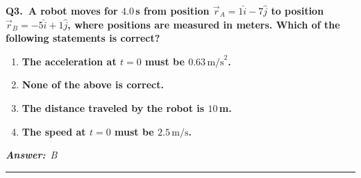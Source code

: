 \documentclass[11pt]{article}
\newcommand{\QuestionStyle}[1]{{\large\bfseries\boldmath #1}}
\newcommand{\AnswerStyle}[1]{{\large\bfseries\boldmath #1}}
\newcommand{\ReasonStyle}[1]{{\normalsize #1}}
\newif\ifshowreason
\newcommand{\Correct}[2]{%
  \item \AnswerStyle{\textcolor{AnsRed}{#1}}%
  \ifshowreason\\[-0.2em]
    \ReasonStyle{\textcolor{AnsRed}{#2}}%
  \fi
}
\newcommand{\Wrong}[2]{%
  \item \AnswerStyle{\textcolor{WrongBlue}{#1}}%
  \ifshowreason\\[-0.2em]
    \ReasonStyle{\textcolor{WrongBlue}{#2}}%
  \fi
}
\newcommand{\QBlock}[4]{%
  \Needspace{8\baselineskip}%
  \noindent
  \begin{minipage}{\linewidth}
    \QuestionStyle{#1.~#2}

    \vspace{0.25em}
    \begin{enumerate}
      #3
    \end{enumerate}

    \vspace{0.1em}
    \noindent\textcolor{AnsRed}{\textit{\textbf{Answer:}~#4}}

    \vspace{0.25em}
    \hrule height 0.4pt
  \end{minipage}
  \vspace{0.75em}
}
\begin{document}
\QBlock{Q3}{A robot moves for $4.0\,$s from position $\vec r_A = 1\hat{i}-7\hat{j}$ to position $\vec r_B = -5\hat{i}+1\hat{j}$, where positions are measured in meters. Which of the following statements is correct?}{
\Wrong{The acceleration at $t=0$ must be $0.63\,\text{m/s}^2$.}{This is a misconception because acceleration cannot be uniquely determined from only initial position, final position, and elapsed time. Many different motions with different accelerations could connect the same two points in $4.0\,$s.}
\Correct{None of the above is correct.}{From the given data, the displacement is $\Delta\vec r=\vec r_B-\vec r_A=(-6)\hat{i}+8\hat{j}$, whose magnitude is $|\Delta\vec r|=\sqrt{(-6)^2+8^2}=10\,\text{m}$. However, this $10\,\text{m}$ is the displacement magnitude, not necessarily the distance traveled, and the information provided is insufficient to determine the instantaneous speed or acceleration at $t=0$. Therefore none of the other statements must be true.}
\Wrong{The distance traveled by the robot is $10\,$m.}{This confuses displacement magnitude with path length. The straight-line displacement is $10\,$m, but the actual distance traveled depends on the path and cannot be known from the endpoints alone.}
\Wrong{The speed at $t=0$ must be $2.5\,\text{m/s}$.}{This comes from dividing the displacement magnitude by the total time, which gives only a rough average based on endpoint information. Instantaneous speed at the initial moment cannot be determined without more information about the motion.}
}{B}
\end{document}
